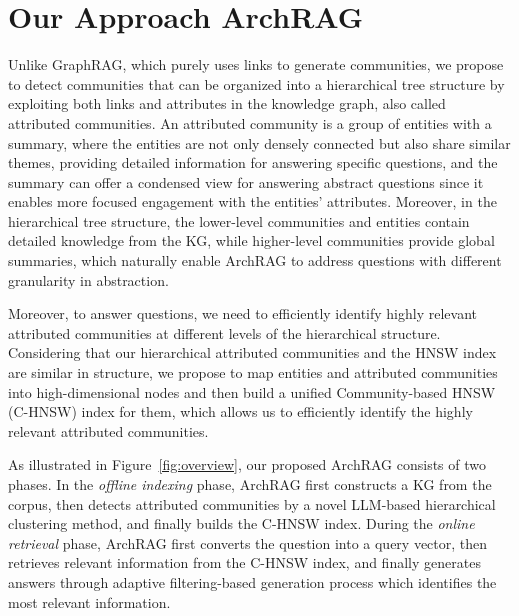 \section{Our Approach ArchRAG}
\label{sec:ArchRAG}

Unlike GraphRAG, which purely uses links to generate communities, we propose to detect communities that can be organized into a hierarchical tree structure by exploiting both links and attributes in the knowledge graph, also called attributed communities.
%
An attributed community is a group of entities with a summary, where the entities are not only densely connected but also share similar themes, providing detailed information for answering specific questions, and the summary can offer a condensed view for answering abstract questions since it enables more focused engagement with the entities’ attributes.
%
Moreover, in the hierarchical tree structure, the lower-level communities and entities contain detailed knowledge from the KG, while higher-level communities provide global summaries, which naturally enable ArchRAG to address questions with different granularity in abstraction.

Moreover, to answer questions, we need to efficiently identify highly relevant attributed communities at different levels of the hierarchical structure.
% 
Considering that our hierarchical attributed communities and the HNSW index~\cite{malkov2018efficient} are similar in structure, we propose to map entities and attributed communities into high-dimensional nodes and then build a unified Community-based HNSW (C-HNSW) index for them, which allows us to efficiently identify the highly relevant attributed communities.

As illustrated in Figure~\ref{fig:overview}, our proposed ArchRAG consists of two phases. 
% 
In the {\it offline indexing} phase, ArchRAG first constructs a KG from the corpus, then detects attributed communities by a novel LLM-based hierarchical clustering method, and finally builds the C-HNSW index.
% 
During the {\it online retrieval} phase, ArchRAG first converts the question into a query vector, then retrieves relevant information from the C-HNSW index, and finally generates answers through adaptive filtering-based generation process which identifies the most relevant information.

